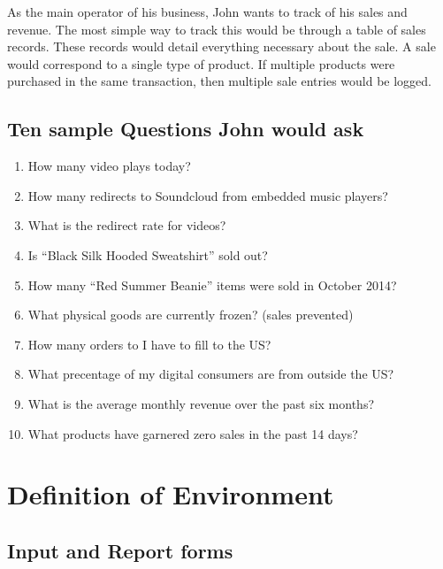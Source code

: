 \documentclass[11pt, a4paper]{report}
\begin{document}
As the main operator of his business, John wants to track of his sales and revenue. The most simple way to track this would be through a table of sales records. These records would detail everything necessary about the sale. A sale would correspond to a single type of product. If multiple products were purchased in the same transaction, then multiple sale entries would be logged.\\

\clearpage
\section{Ten sample Questions John would ask}
\begin{enumerate}
    \item How many video plays today?
    \item How many redirects to Soundcloud from embedded music players?
    \item What is the redirect rate for videos?
    \item Is ``Black Silk Hooded Sweatshirt'' sold out?
    \item How many ``Red Summer Beanie'' items were sold in October 2014?
    \item What physical goods are currently frozen? (sales prevented)
    \item How many orders to I have to fill to the US?
    \item What precentage of my digital consumers are from outside the US?
    \item What is the average monthly revenue over the past six months?
    \item What products have garnered zero sales in the past 14 days? 
\end{enumerate}

\chapter{Definition of Environment}

\section{Input and Report forms}
\end{document}
